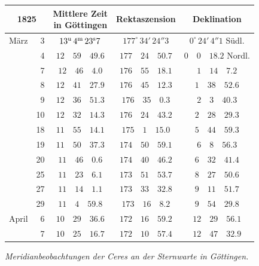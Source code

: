\begin{center}
\begingroup\small\setlength{\tabcolsep}{4pt}
\begin{tabular}{lr|c|c|c}
\multicolumn{2}{c|}{1825} & \shortstack{Mittlere Zeit\\in Göttingen} & Rektaszension & Deklination \\
\hline
März & 3 & $13^{\rm u}\,4^{\rm m}\,23^{\rm s}7$ & $177^{\circ}\,34'\,24''3$ & $0^{\circ}\,24'\,4''1$ Südl. \\
 & 4 & $12\quad59\quad49.6$ & $177\quad24\quad50.7$ & $0\quad0\quad18.2$ Nordl. \\
 & 7 & $12\quad46\quad4.0$ & $176\quad55\quad18.1$ & $1\quad14\quad7.2$ \\
 & 8 & $12\quad41\quad27.9$ & $176\quad45\quad12.3$ & $1\quad38\quad52.6$ \\
 & 9 & $12\quad36\quad51.3$ & $176\quad35\quad0.3$ & $2\quad3\quad40.3$ \\
 & 10 & $12\quad32\quad14.3$ & $176\quad24\quad43.2$ & $2\quad28\quad29.3$ \\
 & 18 & $11\quad55\quad14.1$ & $175\quad1\quad15.0$ & $5\quad44\quad59.3$ \\
 & 19 & $11\quad50\quad37.3$ & $174\quad50\quad59.1$ & $6\quad8\quad56.3$ \\
 & 20 & $11\quad46\quad0.6$ & $174\quad40\quad46.2$ & $6\quad32\quad41.4$ \\
 & 25 & $11\quad23\quad6.1$ & $173\quad51\quad53.7$ & $8\quad27\quad50.6$ \\
 & 27 & $11\quad14\quad1.1$ & $173\quad33\quad32.8$ & $9\quad11\quad51.7$ \\
 & 29 & $11\quad4\quad59.8$ & $173\quad16\quad8.2$ & $9\quad54\quad29.8$ \\
April & 6 & $10\quad29\quad36.6$ & $172\quad16\quad59.2$ & $12\quad29\quad56.1$ \\
 & 7 & $10\quad25\quad16.7$ & $172\quad10\quad57.4$ & $12\quad47\quad32.9$ \\
\end{tabular}
\endgroup
\end{center}

\begin{center}
\emph{Meridianbeobachtungen der Ceres an der Sternwarte in Göttingen.}
\end{center}

